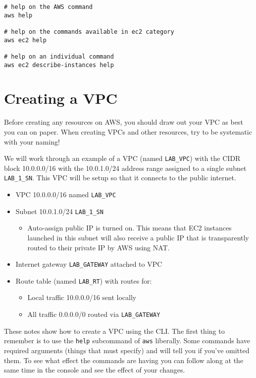 \begin{verbatim}
# help on the AWS command
aws help

# help on the commands available in ec2 category
aws ec2 help

# help on an individual command 
aws ec2 describe-instances help
\end{verbatim}

\section{Creating a VPC}\label{creating-a-vpc}

Before creating any resources on AWS, you should draw out your VPC as
best you can on paper. When creating VPCs and other resources, try to be
systematic with your naming!

We will work through an example of a VPC (named \texttt{LAB\_VPC}) with
the CIDR block 10.0.0.0/16 with the 10.0.1.0/24 address range assigned
to a single subnet \texttt{LAB\_1\_SN}. This VPC will be setup so that
it connects to the public internet.

\begin{itemize}
\item
  VPC 10.0.0.0/16 named \texttt{LAB\_VPC}
\item
  Subnet 10.0.1.0/24 \texttt{LAB\_1\_SN}

  \begin{itemize}
  
  \item
    Auto-assign public IP is turned on. This means that EC2 instances
    launched in this subnet will also receive a public IP that is
    transparently routed to their private IP by AWS using NAT.
  \end{itemize}
\item
  Internet gateway \texttt{LAB\_GATEWAY} attached to VPC
\item
  Route table (named \texttt{LAB\_RT}) with routes for:

  \begin{itemize}
  \item
    Local traffic 10.0.0.0/16 sent locally
  \item
    All traffic 0.0.0.0/0 routed via \texttt{LAB\_GATEWAY}
  \end{itemize}
\end{itemize}

These notes show how to create a VPC using the CLI. The first thing to
remember is to use the \texttt{help} subcommand of \texttt{aws}
liberally. Some commands have required arguments (things that must
specify) and will tell you if you've omitted them. To see what effect
the commands are having you can follow along at the same time in the
console and see the effect of your changes.

